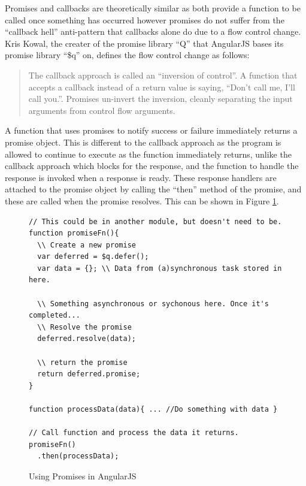 Promises and callbacks are theoretically similar as both provide a
function to be called once something has occurred however promises do
not suffer from the ``callback hell'' anti-pattern that callbacks
alone do due to a flow control change.
Kris Kowal, the creater of the promise library ``Q'' that
AngularJS bases its promise library ``\$q'' on, defines the flow
control change as follows:
\begin{quote}
The callback approach is called an ``inversion of control''. A function
that accepts a callback instead of a return value is saying, ``Don’t
call me, I’ll call you.''. Promises un-invert the inversion, cleanly
separating the input arguments from control flow arguments.\cite{kriskowalq}
\end{quote}

A function that uses promises to notify success or failure immediately
returns a promise object. This is different to the callback approach
as the program is allowed to continue to execute as the function
immediately returns, unlike the callback approach which blocks for the
response, and the function to handle the response is invoked when a
response is ready. These response handlers are attached to the promise
object by calling the ``then'' method of the promise, and these are
called when the promise resolves. This can be shown in Figure
\ref{fig:promises}. 

\begin{figure}[h]
\begin{verbatim}
// This could be in another module, but doesn't need to be.
function promiseFn(){
  \\ Create a new promise
  var deferred = $q.defer();
  var data = {}; \\ Data from (a)synchronous task stored in here.  

  \\ Something asynchronous or sychonous here. Once it's completed...
  \\ Resolve the promise
  deferred.resolve(data);

  \\ return the promise
  return deferred.promise;
}

function processData(data){ ... //Do something with data }

// Call function and process the data it returns.
promiseFn()
  .then(processData);
\end{verbatim}
\caption{Using Promises in AngularJS}
\label{fig:promises}
\end{figure}

